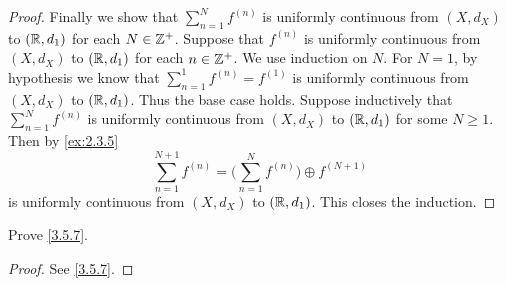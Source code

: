 \begin{proof}
  Finally we show that \(\sum_{n = 1}^N f^{(n)}\) is uniformly continuous from \((X, d_X)\) to \((\mathbb{R}, d_1)\) for each \(N \in \mathbb{Z}^+\).
  Suppose that \(f^{(n)}\) is uniformly continuous from \((X, d_X)\) to \((\mathbb{R}, d_1)\) for each \(n \in \mathbb{Z}^+\).
  We use induction on \(N\).
  For \(N = 1\), by hypothesis we know that \(\sum_{n = 1}^1 f^{(n)} = f^{(1)}\) is uniformly continuous from \((X, d_X)\) to \((\mathbb{R}, d_1)\).
  Thus the base case holds.
  Suppose inductively that \(\sum_{n = 1}^N f^{(n)}\) is uniformly continuous from \((X, d_X)\) to \((\mathbb{R}, d_1)\) for some \(N \geq 1\).
  Then by \cref{ex:2.3.5}
  \[
    \sum_{n = 1}^{N + 1} f^{(n)} = \bigg(\sum_{n = 1}^N f^{(n)}\bigg) \oplus f^{(N + 1)}
  \]
  is uniformly continuous from \((X, d_X)\) to \((\mathbb{R}, d_1)\).
  This closes the induction.
\end{proof}

\begin{ex}\label{ex:3.5.2}
  Prove \cref{3.5.7}.
\end{ex}

\begin{proof}
  See \cref{3.5.7}.
\end{proof}
